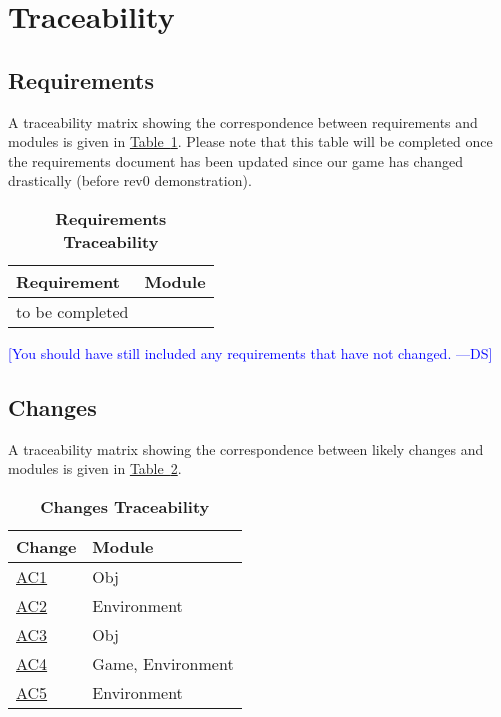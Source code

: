\documentclass[12pt, titlepage]{article}
\newcommand{\authornote}[3]{\textcolor{#1}{[#3 ---#2]}}
\newcommand{\authornote}[3]{}
\newcommand{\ds}[1]{\authornote{blue}{DS}{#1}}
\begin{document}
\section{Traceability}
\subsection{Requirements}
A traceability matrix showing the correspondence between requirements and modules is given in \hyperref[tab:reqtrace]{Table~\ref*{tab:reqtrace}}.  Please note that this table will be completed once the requirements document has been updated since our game has changed drastically (before rev0 demonstration).

\begin{table}[h]
\caption{\bf Requirements Traceability} \label{tab:reqtrace}
\begin{tabularx}{\textwidth}{p{4cm}X}
\toprule {\bf Requirement} & {\bf Module}\\
\midrule
to be completed&\\
\bottomrule
\end{tabularx}
\end{table}

\ds{You should have still included any requirements that have not changed.}

\subsection{Changes}
A traceability matrix showing the correspondence between likely changes and modules is given in \hyperref[tab:changetrace]{Table~\ref*{tab:changetrace}}.

\begin{table}[h]
\caption{\bf Changes Traceability} \label{tab:changetrace}
\begin{tabularx}{\textwidth}{p{4cm}X}
\toprule {\bf Change} & {\bf Module}\\
\midrule
\hyperref[sec:changes]{AC1} & Obj\\
\hyperref[sec:changes]{AC2} & Environment\\
\hyperref[sec:changes]{AC3} & Obj\\
\hyperref[sec:changes]{AC4} & Game, Environment\\
\hyperref[sec:changes]{AC5} & Environment\\
\bottomrule
\end{tabularx}
\end{table}
\end{document}
